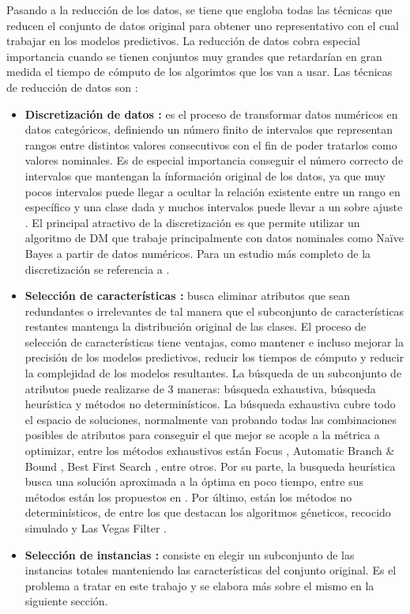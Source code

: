 Pasando a la reducción de los datos, se tiene que engloba todas las técnicas que reducen el conjunto de datos original para obtener uno representativo con el cual trabajar en los modelos predictivos. La reducción de datos cobra especial importancia cuando se tienen conjuntos muy grandes que retardarían en gran medida el tiempo de cómputo de los algorimtos que los van a usar. Las técnicas de reducción de datos son \cite{garcia2016data}:

\begin{itemize}
\item \textbf{Discretización de datos \cite{garcia2016data,garcia2013survey}:}
es el proceso de transformar datos numéricos en datos categóricos, definiendo un número finito de intervalos que representan rangos entre distintos valores consecutivos con el fin de poder tratarlos como valores nominales. Es de especial importancia conseguir el número correcto de intervalos que mantengan la ínformación original de los datos, ya que muy pocos intervalos puede llegar a ocultar la relación existente entre un rango en específico y una clase dada y muchos intervalos puede llevar a un sobre ajuste \cite{cios2007data}. El principal atractivo de la discretización es que permite utilizar un algoritmo de DM que trabaje principalmente con datos nominales como Naïve Bayes \cite{yang2009discretization} a partir de datos numéricos. Para un estudio más completo de la discretización se referencia a \cite{garcia2013survey}.

\item \textbf{Selección de características \cite{garcia2016data,liu2012feature}:}
busca eliminar atributos que sean redundantes o irrelevantes de tal manera que el subconjunto de características restantes mantenga la distribución original de las clases. El proceso de selección de características tiene ventajas, como mantener e incluso mejorar la precisión de los modelos predictivos, reducir los tiempos de cómputo y reducir la complejidad de los modelos resultantes. La búsqueda de un subconjunto de atributos puede realizarse de 3 maneras: búsqueda exhaustiva, búsqueda heurística y métodos no determinísticos. La búsqueda exhaustiva cubre todo el espacio de soluciones, normalmente van probando todas las combinaciones posibles de atributos para conseguir el que mejor se acople a la métrica a optimizar, entre los métodos exhaustivos están Focus \cite{almuallim1991learning}, Automatic Branch \& Bound \cite{liul1998monotonic}, Best First Search \cite{xu1988best}, entre otros. Por su parte, la busqueda heurística busca una solución aproximada a la óptima en poco tiempo, entre sus métodos están los propuestos en \cite{dash1997feature,koller1996toward,battiti1994using}. Por último, están los métodos no determinísticos, de entre los que destacan los algoritmos géneticos, recocido simulado y Las Vegas Filter \cite{liu1996probabilistic}.

\item \textbf{Selección de instancias \cite{garcia2016data}:}
consiste en elegir un subconjunto de las instancias totales manteniendo las características del conjunto original. Es el problema a tratar en este trabajo y se elabora más sobre el mismo en la siguiente sección.
\end{itemize}

